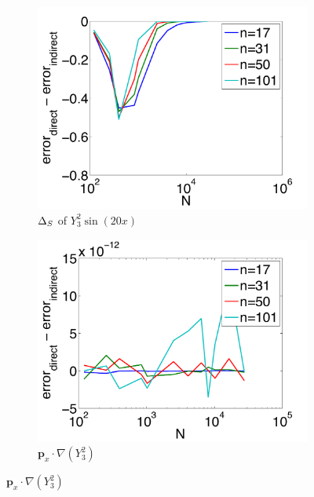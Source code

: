 \begin{figure}[htbp]
	\centering
	\begin{subfigure}[b]{0.425\textwidth}
	\includegraphics[width=1.0\textwidth]{../figures/appendices/direct_vs_indirect_weights/compare_weight_generation/lsfc_vs_px_grad_dot_px_grad/diff_of_rel_l2_errors.pdf}
	\caption{$\LaplaceBeltrami$ of $Y_{3}^{2} \sin(20 x)$}
	\end{subfigure}
	\begin{subfigure}[b]{0.425\textwidth}
	\includegraphics[width=1.0\textwidth]{../figures/appendices/direct_vs_indirect_weights/compare_weight_generation/xsfc_vs_xsfc_alt_on_sph32/diff_of_rel_l2_errors.pdf}
	\caption{$\mathbf{p}_{x} \cdot \nabla ( Y_{3}^{2})$ }
	\end{subfigure}

\end{figure}
